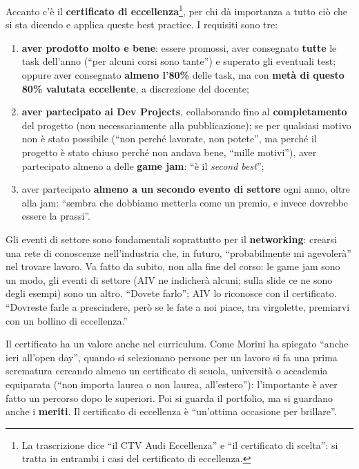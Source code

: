 Accanto c'è il \textbf{certificato di eccellenza}\footnote{La trascrizione
dice ``il CTV Audi Eccellenza'' e ``il certificato di scelta'': si tratta in
entrambi i casi del certificato di eccellenza.}, per chi dà importanza a
tutto ciò che si sta dicendo e applica queste best practice. I requisiti
sono tre:
\begin{enumerate}
  \item \textbf{aver prodotto molto e bene}: essere promossi, aver
        consegnato \textbf{tutte} le task dell'anno (``per alcuni corsi sono
        tante'') e superato gli eventuali test; oppure aver consegnato
        \textbf{almeno l'80\%} delle task, ma con \textbf{metà di questo 80\%
        valutata eccellente}, a discrezione del docente;
  \item \textbf{aver partecipato ai Dev Projects}, collaborando fino al
        \textbf{completamento} del progetto (non necessariamente alla
        pubblicazione); se per qualsiasi motivo non è stato possibile
        (``non perché lavorate, non potete'', ma perché il progetto è stato
        chiuso perché non andava bene, ``mille motivi''), aver partecipato
        almeno a delle \textbf{game jam}: ``è il \emph{second best}'';
  \item aver partecipato \textbf{almeno a un secondo evento di settore}
        ogni anno, oltre alla jam: ``sembra che dobbiamo metterla come un
        premio, e invece dovrebbe essere la prassi''.
\end{enumerate}

Gli eventi di settore sono fondamentali soprattutto per il
\textbf{networking}: crearsi una rete di conoscenze nell'industria che, in
futuro, ``probabilmente mi agevolerà'' nel trovare lavoro. Va fatto da
subito, non alla fine del corso: le game jam sono un modo, gli eventi di
settore (AIV ne indicherà alcuni; sulla slide ce ne sono degli esempi) sono un
altro. ``Dovete farlo''; AIV lo riconosce con il certificato. ``Dovreste
farle a prescindere, però se le fate a noi piace, tra virgolette, premiarvi
con un bollino di eccellenza.''

Il certificato ha un valore anche nel curriculum. Come Morini ha spiegato
``anche ieri all'open day'', quando si selezionano persone per un lavoro si
fa una prima scrematura cercando almeno un certificato di scuola, università
o accademia equiparata (``non importa laurea o non laurea, all'estero''):
l'importante è aver fatto un percorso dopo le superiori. Poi si guarda il
portfolio, ma si guardano anche i \textbf{meriti}. Il certificato di
eccellenza è ``un'ottima occasione per brillare''.

